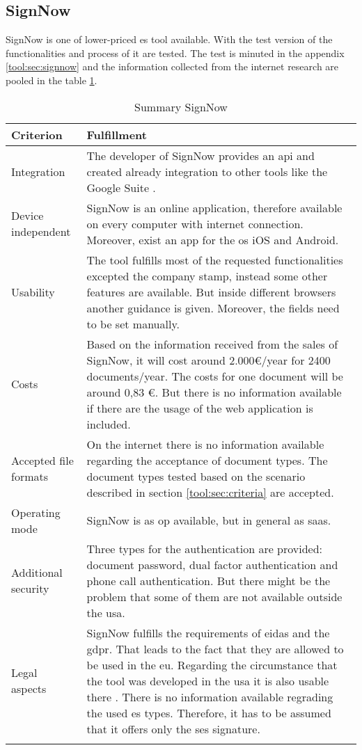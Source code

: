 \subsection{SignNow}
SignNow is one of lower-priced \gls{es} tool available. With the test version of the functionalities and process of it are tested. The test is minuted in the appendix \ref{tool:sec:signnow} and the information collected from the internet research are pooled in the table \ref{tool:tab:signnow}.
	\begin{longtable}{|p{4cm}|p{10cm}|} \hline
		\rowcolor{Gray}Criterion & Fulfillment \\ \hline
		Integration & The developer of SignNow provides an \gls{api} and created already integration to other tools like the Google Suite \parencite{signnow2018enterprise,signnow2018price}.\\ \hline
		Device independent & SignNow is an online application, therefore available on every computer with internet connection. Moreover, exist an \gls{app} for the \gls{os} iOS and Android.\\ \hline
		Usability & The tool fulfills most of the requested functionalities excepted the company stamp, instead some other features are available. But inside different browsers another guidance is given. Moreover, the fields need to be set manually.\\ \hline
		Costs & Based on the information received from the sales of SignNow, it will cost around 2.000\euro /year for 2400 documents/year. The costs for one document will be around 0,83 \euro. But there is no information available if there are the usage of the web application is included. \\ \hline
		Accepted file formats & On the internet there is no information available regarding the acceptance of document types. The document types tested based on the scenario described in section \ref{tool:sec:criteria} are accepted.\\ \hline
		Operating mode & SignNow is as \gls{op} available, but in general as \gls{saas}. \parencite{signnow2018op} \\ \hline
		Additional security & Three types for the authentication are provided: document password, dual factor authentication and phone call authentication. But there might be the problem that some of them are not available outside the \gls{usa}. \parencite{signnow2018security} \\ \hline
		Legal aspects & SignNow fulfills the requirements of \gls{eidas} and the \gls{gdpr}. That leads to the fact that they are allowed to be used in the \gls{eu}. Regarding the circumstance that the tool was developed in the \gls{usa} it is also usable there \parencite{signnow2018legal}. There is no information available regrading the used \gls{es} types. Therefore, it has to be assumed that it offers only the \gls{ses} signature. \\ \hline
	\caption{Summary SignNow}
	\label{tool:tab:signnow}
	\end{longtable}

